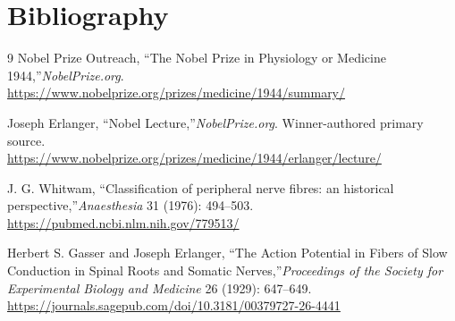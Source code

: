 \section{Bibliography}

\begin{thebibliography}{9}
Nobel Prize Outreach, ``The Nobel Prize in Physiology or Medicine 1944,''\emph{NobelPrize.org}.\\
\url{https://www.nobelprize.org/prizes/medicine/1944/summary/}

Joseph Erlanger, ``Nobel Lecture,''\emph{NobelPrize.org}. Winner-authored primary source.\\
\url{https://www.nobelprize.org/prizes/medicine/1944/erlanger/lecture/}

J. G. Whitwam, ``Classification of peripheral nerve fibres: an historical perspective,''\emph{Anaesthesia} 31 (1976): 494--503.\\
\url{https://pubmed.ncbi.nlm.nih.gov/779513/}

Herbert S. Gasser and Joseph Erlanger, ``The Action Potential in Fibers of Slow Conduction in Spinal Roots and Somatic Nerves,''\emph{Proceedings of the Society for Experimental Biology and Medicine} 26 (1929): 647--649.\\
\url{https://journals.sagepub.com/doi/10.3181/00379727-26-4441}
\end{thebibliography}
